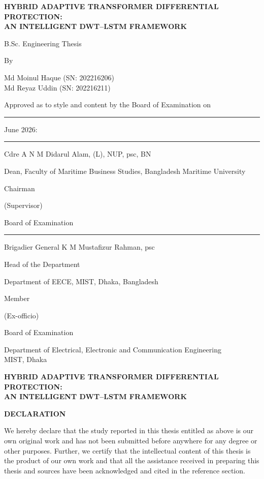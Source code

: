 \documentclass[12pt,a4paper,oneside]{report}
\newcommand{\exblock}[5]{%
  \par\vspace{15pt}\noindent
  \rule{6.2cm}{0.4pt}\par\nobreak\vspace{1pt}
  \noindent\begin{minipage}[t]{0.62\textwidth}\raggedright\strut#1\\\strut#2\\\strut#3\end{minipage}%
  \hfill
  \begin{minipage}[t]{0.34\textwidth}\raggedleft\strut#4\\\strut#5\\\strut Board of Examination\end{minipage}\par}
\begin{document}
\clearpage\thispagestyle{fancy}
\begin{center}
{\large\bfseries HYBRID ADAPTIVE TRANSFORMER DIFFERENTIAL PROTECTION:\\ AN INTELLIGENT DWT--LSTM FRAMEWORK\par}
\vspace{0.2in}
{B.Sc. Engineering Thesis\par}
\vspace{6pt}
{By\par}
\vspace{6pt}
{Md Moinul Haque (SN: 202216206)\\ Md Reyaz Uddin (SN: 202216211)\par}
\end{center}
\vspace{0.18in}
\noindent Approved as to style and content by the Board of Examination on \rule{2.2cm}{0.4pt} June 2026:
\vspace{0.6in}
\exblock{Cdre A N M Didarul Alam, (L), NUP, psc, BN}{Dean, Faculty of Maritime Business Studies, Bangladesh Maritime University}{}{Chairman}{(Supervisor)}
\exblock{Brigadier General K M Mustafizur Rahman, psc}{Head of the Department}{Department of EECE, MIST, Dhaka, Bangladesh}{Member}{(Ex-officio)}
\vfill
\begin{center}
Department of Electrical, Electronic and Communication Engineering\\ MIST, Dhaka
\end{center}

\clearpage\thispagestyle{fancy}
\begin{center}
{\large\bfseries HYBRID ADAPTIVE TRANSFORMER DIFFERENTIAL PROTECTION:\\ AN INTELLIGENT DWT--LSTM FRAMEWORK\par}
\vspace{0.35in}
{\bfseries DECLARATION\par}
\end{center}
\vspace{0.3in}
We hereby declare that the study reported in this thesis entitled as above is our own original work and has not been submitted before anywhere for any degree or other purposes. Further, we certify that the intellectual content of this thesis is the product of our own work and that all the assistance received in preparing this thesis and sources have been acknowledged and cited in the reference section.
\vspace{0.6in}
\end{document}
